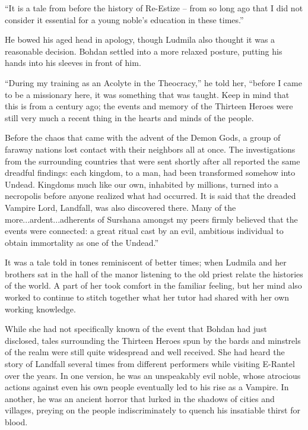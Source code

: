  

“It is a tale from before the history of Re-Estize – from so long ago that I did not consider it essential for a young noble’s education in these times.”

 

He bowed his aged head in apology, though Ludmila also thought it was a reasonable decision. Bohdan settled into a more relaxed posture, putting his hands into his sleeves in front of him.

 

“During my training as an Acolyte in the Theocracy,” he told her, “before I came to be a missionary here, it was something that was taught. Keep in mind that this is from a century ago; the events and memory of the Thirteen Heroes were still very much a recent thing in the hearts and minds of the people.

 

Before the chaos that came with the advent of the Demon Gods, a group of faraway nations lost contact with their neighbors all at once. The investigations from the surrounding countries that were sent shortly after all reported the same dreadful findings: each kingdom, to a man, had been transformed somehow into Undead. Kingdoms much like our own, inhabited by millions, turned into a necropolis before anyone realized what had occurred. It is said that the dreaded Vampire Lord, Landfall, was also discovered there. Many of the more...ardent...adherents of Surshana amongst my peers firmly believed that the events were connected: a great ritual cast by an evil, ambitious individual to obtain immortality as one of the Undead.”

 

It was a tale told in tones reminiscent of better times; when Ludmila and her brothers sat in the hall of the manor listening to the old priest relate the histories of the world. A part of her took comfort in the familiar feeling, but her mind also worked to continue to stitch together what her tutor had shared with her own working knowledge.

 

While she had not specifically known of the event that Bohdan had just disclosed, tales surrounding the Thirteen Heroes spun by the bards and minstrels of the realm were still quite widespread and well received. She had heard the story of Landfall several times from different performers while visiting E-Rantel over the years. In one version, he was an unspeakably evil noble, whose atrocious actions against even his own people eventually led to his rise as a Vampire. In another, he was an ancient horror that lurked in the shadows of cities and villages, preying on the people indiscriminately to quench his insatiable thirst for blood.

